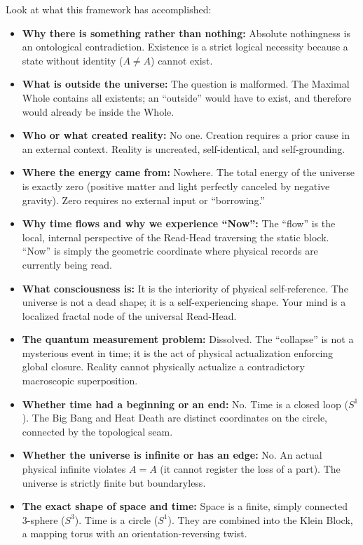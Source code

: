 \documentclass[11pt]{article}
\theoremstyle{canonstyle}
\providecommand{\Sone}{S^1}
\providecommand{\Sthree}{S^3}
\begin{document}
\begin{realization}
Look at what this framework has accomplished:

\medskip

\begin{itemize}
    \item \textbf{Why there is something rather than nothing:} Absolute nothingness is an ontological contradiction. Existence is a strict logical necessity because a state without identity ($A \neq A$) cannot exist.
    \item \textbf{What is outside the universe:} The question is malformed. The Maximal Whole contains all existents; an ``outside'' would have to exist, and therefore would already be inside the Whole.
    \item \textbf{Who or what created reality:} No one. Creation requires a prior cause in an external context. Reality is uncreated, self-identical, and self-grounding.
    \item \textbf{Where the energy came from:} Nowhere. The total energy of the universe is exactly zero (positive matter and light perfectly canceled by negative gravity). Zero requires no external input or ``borrowing.''
    \item \textbf{Why time flows and why we experience ``Now'':} The ``flow'' is the local, internal perspective of the Read-Head traversing the static block. ``Now'' is simply the geometric coordinate where physical records are currently being read.
    \item \textbf{What consciousness is:} It is the interiority of physical self-reference. The universe is not a dead shape; it is a self-experiencing shape. Your mind is a localized fractal node of the universal Read-Head.
    \item \textbf{The quantum measurement problem:} Dissolved. The ``collapse'' is not a mysterious event in time; it is the act of physical actualization enforcing global closure. Reality cannot physically actualize a contradictory macroscopic superposition.
    \item \textbf{Whether time had a beginning or an end:} No. Time is a closed loop ($\Sone$). The Big Bang and Heat Death are distinct coordinates on the circle, connected by the topological seam.
    \item \textbf{Whether the universe is infinite or has an edge:} No. An actual physical infinite violates $A=A$ (it cannot register the loss of a part). The universe is strictly finite but boundaryless.
    \item \textbf{The exact shape of space and time:} Space is a finite, simply connected 3-sphere ($\Sthree$). Time is a circle ($\Sone$). They are combined into the Klein Block, a mapping torus with an orientation-reversing twist.

\end{itemize}
\end{realization}
\end{document}
